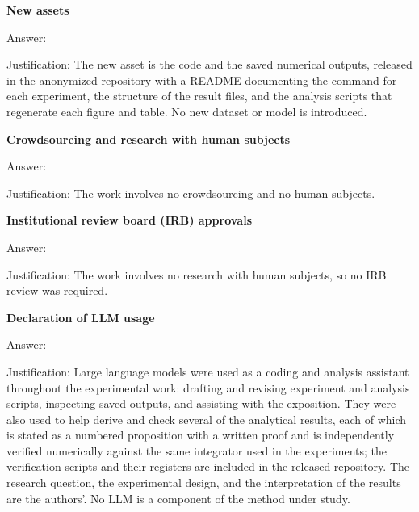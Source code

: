 \item {\bf New assets}
    \item[] Answer: \answerYes{}
    \item[] Justification: The new asset is the code and the saved numerical outputs, released in
    the anonymized repository with a README documenting the command for each experiment, the
    structure of the result files, and the analysis scripts that regenerate each figure and
    table. No new dataset or model is introduced.

\item {\bf Crowdsourcing and research with human subjects}
    \item[] Answer: \answerNA{}
    \item[] Justification: The work involves no crowdsourcing and no human subjects.

\item {\bf Institutional review board (IRB) approvals}
    \item[] Answer: \answerNA{}
    \item[] Justification: The work involves no research with human subjects, so no IRB review
    was required.

\item {\bf Declaration of LLM usage}
    \item[] Answer: \answerYes{}
    \item[] Justification: Large language models were used as a coding and analysis assistant
    throughout the experimental work: drafting and revising experiment and analysis scripts,
    inspecting saved outputs, and assisting with the exposition. They were also used to help
    derive and check several of the analytical results, each of which is stated as a numbered
    proposition with a written proof and is independently verified numerically against the same
    integrator used in the experiments; the verification scripts and their registers are included
    in the released repository. The research question, the experimental design, and the
    interpretation of the results are the authors'. No LLM is a component of the method under
    study.
